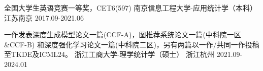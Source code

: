\begin{educventries}
  \educventry
    {全国大学生英语竞赛一等奖，CET6(597)}
    {南京信息工程大学-应用统计学（本科）}
    {江苏南京}
    {2017.09-2021.06}

  \educventry
    {一作发表深度生成模型论文一篇(CCF-A)，图推荐系统论文一篇(中科院一区\&CCF-B)
    和深度强化学习论文一篇(中科院二区)，另有两篇以一作/共同一作投稿至TKDE及ICML24。}
    {浙江工商大学-理学统计学（硕士）}
    {浙江杭州}
    {2021.09-2024.01}

\end{educventries}
